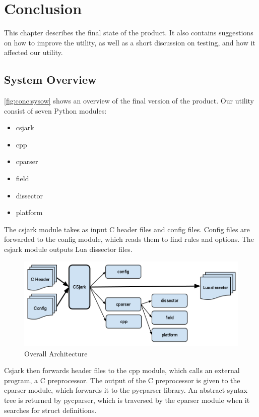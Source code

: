 \chapter{Conclusion}
\label{cha:conclusion}
This chapter describes the final state of the product. It also contains
suggestions on how to improve the utility, as well as a short discussion
on testing, and how it affected our utility.


\section{System Overview}
\autoref{fig:conc:sysow} shows an overview of the final version of the
product. Our utility consist of seven Python modules:
\begin{itemize}
	\item csjark
	\item cpp
	\item cparser
	\item field
	\item dissector
	\item platform
\end{itemize}
The csjark module takes as input C header files and config files. Config
files are forwarded to the config module, which reads them to find rules and
options. The csjark module outputs Lua dissector files.

\begin{figure}[htb]
	\includegraphics[width=\textwidth]{./planning/img/final_arch}
	\caption{Overall Architecture\label{fig:conc:sysow}}
\end{figure}

Csjark then forwards header files to the cpp module, which calls an external
program, a C preprocessor. The output of the C preprocessor is given to the
cparser module, which forwards it to the pycparser library. An abstract
syntax tree is returned by pycparser, which is traversed by the cparser
module when it searches for struct definitions.


